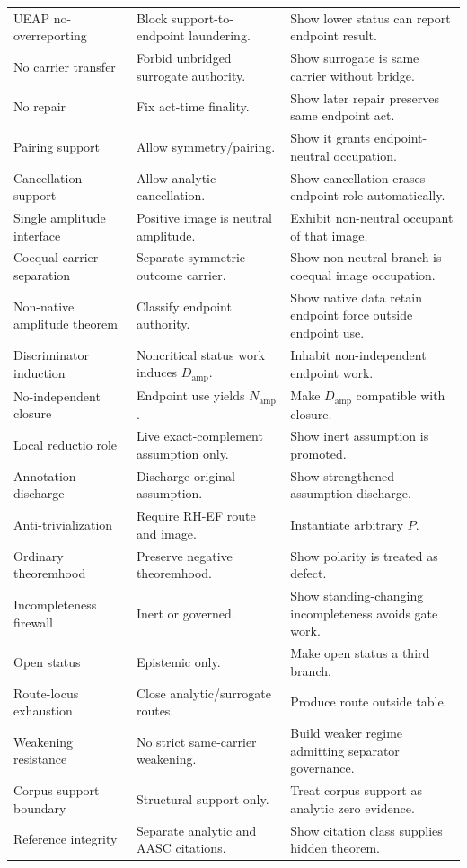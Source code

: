 \documentclass[11pt]{article}
\newcommand{\Damp}{D_{\mathrm{amp}}}
\newcommand{\Namp}{N_{\mathrm{amp}}}
\begin{document}
\begin{longtable}{L{0.25\textwidth}L{0.34\textwidth}L{0.31\textwidth}}
UEAP no-overreporting & Block support-to-endpoint laundering. & Show lower status can report endpoint result.\\
No carrier transfer & Forbid unbridged surrogate authority. & Show surrogate is same carrier without bridge.\\
No repair & Fix act-time finality. & Show later repair preserves same endpoint act.\\
Pairing support & Allow symmetry/pairing. & Show it grants endpoint-neutral occupation.\\
Cancellation support & Allow analytic cancellation. & Show cancellation erases endpoint role automatically.\\
Single amplitude interface & Positive image is neutral amplitude. & Exhibit non-neutral occupant of that image.\\
Coequal carrier separation & Separate symmetric outcome carrier. & Show non-neutral branch is coequal image occupation.\\
Non-native amplitude theorem & Classify endpoint authority. & Show native data retain endpoint force outside endpoint use.\\
Discriminator induction & Noncritical status work induces \(\Damp\). & Inhabit non-independent endpoint work.\\
No-independent closure & Endpoint use yields \(\Namp\). & Make \(\Damp\) compatible with closure.\\
Local reductio role & Live exact-complement assumption only. & Show inert assumption is promoted.\\
Annotation discharge & Discharge original assumption. & Show strengthened-assumption discharge.\\
Anti-trivialization & Require RH-EF route and image. & Instantiate arbitrary \(P\).\\
Ordinary theoremhood & Preserve negative theoremhood. & Show polarity is treated as defect.\\
Incompleteness firewall & Inert or governed. & Show standing-changing incompleteness avoids gate work.\\
Open status & Epistemic only. & Make open status a third branch.\\
Route-locus exhaustion & Close analytic/surrogate routes. & Produce route outside table.\\
Weakening resistance & No strict same-carrier weakening. & Build weaker regime admitting separator governance.\\
Corpus support boundary & Structural support only. & Treat corpus support as analytic zero evidence.\\
Reference integrity & Separate analytic and AASC citations. & Show citation class supplies hidden theorem.\\
\bottomrule
\end{longtable}
\endgroup
\end{document}
